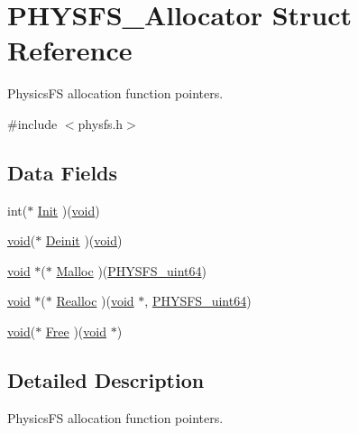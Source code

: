 \hypertarget{struct_p_h_y_s_f_s___allocator}{}\section{P\+H\+Y\+S\+F\+S\+\_\+\+Allocator Struct Reference}
\label{struct_p_h_y_s_f_s___allocator}


Physics\+FS allocation function pointers.  




{\ttfamily \#include $<$physfs.\+h$>$}

\subsection*{Data Fields}
\begin{DoxyCompactItemize}
\item 
int($\ast$ \hyperlink{struct_p_h_y_s_f_s___allocator_a61dd95a74a5c9557645249b30e41d933}{Init} )(\hyperlink{png_8h_ac9c84fa68bbad002983e35ce3663c686}{void})
\item 
\hyperlink{png_8h_ac9c84fa68bbad002983e35ce3663c686}{void}($\ast$ \hyperlink{struct_p_h_y_s_f_s___allocator_a34a667936ebcb017a58edfd4695a6e77}{Deinit} )(\hyperlink{png_8h_ac9c84fa68bbad002983e35ce3663c686}{void})
\item 
\hyperlink{png_8h_ac9c84fa68bbad002983e35ce3663c686}{void} $\ast$($\ast$ \hyperlink{struct_p_h_y_s_f_s___allocator_a470bc12185fbcef62ebf509fdf1870b5}{Malloc} )(\hyperlink{physfs_8h_a632ba02500231e5f6f6df2e4cb71c818}{P\+H\+Y\+S\+F\+S\+\_\+uint64})
\item 
\hyperlink{png_8h_ac9c84fa68bbad002983e35ce3663c686}{void} $\ast$($\ast$ \hyperlink{struct_p_h_y_s_f_s___allocator_abc71951013cda22b8177b831bfaf8579}{Realloc} )(\hyperlink{png_8h_ac9c84fa68bbad002983e35ce3663c686}{void} $\ast$, \hyperlink{physfs_8h_a632ba02500231e5f6f6df2e4cb71c818}{P\+H\+Y\+S\+F\+S\+\_\+uint64})
\item 
\hyperlink{png_8h_ac9c84fa68bbad002983e35ce3663c686}{void}($\ast$ \hyperlink{struct_p_h_y_s_f_s___allocator_ad281f87d133a480afa98182967c7e313}{Free} )(\hyperlink{png_8h_ac9c84fa68bbad002983e35ce3663c686}{void} $\ast$)
\end{DoxyCompactItemize}


\subsection{Detailed Description}
Physics\+FS allocation function pointers. 


